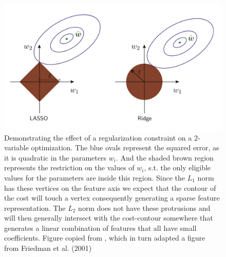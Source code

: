 \begin{figure}
\centering
\includegraphics[width=\textwidth]{../figures/regularization}
\caption{Demonstrating the effect of a regularization constraint on a 2-variable optimization. The blue ovals represent the squared error, as it is quadratic in the parameters $w_i$. And the shaded brown region represents the restriction on the values of $w_i$, s.t. the only eligible values for the parameters are inside this region. Since the $L_1$ norm has these vertices on the feature axis we expect that the contour of the cost will touch a vertex consequently generating a sparse feature representation. The $L_2$ norm does not have these protrusions and will then generally intersect with the cost-contour somewhere that generates a linear combination of features that all have small coefficients. Figure copied from \citet{Mehta2019}, which in turn adapted a figure from Friedman et al. (2001)}\label{fig:regularization}
\end{figure}